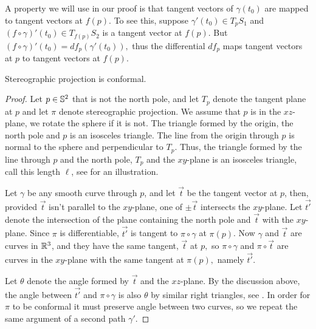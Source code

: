 A property we will use in our proof is that tangent vectors of $\gamma(t_0)$ are mapped
to tangent vectors at $f(p)$. To see this, suppose $\gamma'(t_0)\in T_pS_1$ and
$(f\circ \gamma)'(t_0)\in T_{f(p)}S_2$ is a tangent vector at $f(p)$. But
$(f\circ \gamma)'(t_0)=df_p(\gamma'(t_0)),$ thus the differential $df_p$ maps
tangent vectors at $p$ to tangent vectors at $f(p).$




\begin{theorem}\label{thm:stereo-confroms}
Stereographic projection is conformal.
\end{theorem}
\begin{proof}
	Let $p\in\mathbb{S}^2$ that is not the north pole, and let $T_p$ denote the tangent
	plane at $p$ and let $\pi$ denote stereographic projection.
	 We assume that $p$ is in the $xz$-plane, we rotate the sphere if it is not.
	The triangle formed by the origin, the north pole and $p$
	is an isosceles triangle. 
	The line from the origin through $p$ is normal to the sphere and perpendicular
	to $T_p$. Thus, the triangle formed by the line through $p$ and the north pole,
	$T_p$ and the $xy$-plane is an isosceles triangle, call this length $\ell$, 
	see  for an illustration.
	
	Let $\gamma$ be any smooth curve through $p$, and let $\vec{t}$ be the tangent vector at $p$, then,
	 provided $\vec{t}$ isn't parallel to the $xy$-plane, one of $\pm \vec{t}$
	intersects the $xy$-plane. Let $\vec{t'}$ denote the intersection of the plane containing the north
	pole and $\vec{t}$ with the $xy$-plane. Since $\pi$ is differentiable, $\vec{t'}$ is tangent to $\pi \circ \gamma$ at $\pi(p)$. 
	Now $\gamma$ and $\vec{t}$ are curves in $\mathbb{R}^3$, and they have the same tangent, $\vec{t}$
	at $p,$ so $\pi\circ \gamma$ and $\pi \circ \vec{t}$ are curves in the $xy$-plane with the same
	tangent at $\pi(p),$ namely $\vec{t'}.$
	
	Let $\theta$ denote the angle formed by $\vec{t}$ and the $xz$-plane. 
	By the discussion
	above, the angle between $\vec{t'}$ and $\pi \circ \gamma$ is also $\theta$ by similar right triangles,
	see .
	In order for $\pi$ to be conformal it must preserve angle between two curves, so we repeat 
	the same argument of a second path $\gamma'$.
	
	
\end{proof}

